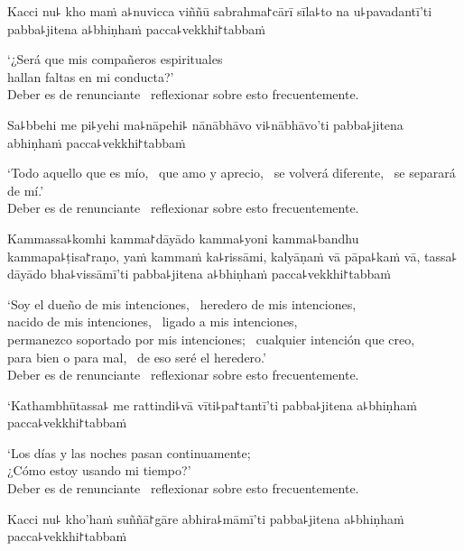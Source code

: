 Kacci nu꜕ kho maṁ a꜕nuvicca viññū sabrahma꜓cārī sīla꜕to na u꜕pavadantī'ti pabba꜕jitena a꜕bhiṇhaṁ pacca꜕vekkhi꜓tabbaṁ

\begin{english}
  ‘¿Será que mis compañeros espirituales \pause\\
  hallan faltas en mi conducta?’ \pause\\
  Deber es de renunciante \pause\ reflexionar sobre esto frecuentemente.
\end{english}

Sa꜕bbehi me pi꜕yehi ma꜕nāpehi꜕ nānābhāvo vi꜕nābhāvo'ti pabba꜕jitena abhiṇhaṁ pacca꜕vekkhi꜓tabbaṁ

\begin{english}
  ‘Todo aquello que es mío, \pause\ que amo y aprecio, \pause\ se volverá diferente, \pause\ se separará de mí.’ \pause\\
  Deber es de renunciante \pause\ reflexionar sobre esto frecuentemente.
\end{english}

Kammassa꜕komhi kamma꜓dāyādo kamma꜕yoni kamma꜕bandhu kammapa꜕ṭisa꜓raṇo, yaṁ kammaṁ ka꜕rissāmi, kalyāṇaṁ vā pāpa꜕kaṁ vā, tassa꜕ dāyādo bha꜕vissāmī'ti pabba꜕jitena a꜕bhiṇhaṁ pacca꜕vekkhi꜓tabbaṁ

\begin{english}
  ‘Soy el dueño de mis intenciones, \pause\ heredero de mis intenciones, \pause\\
  nacido de mis intenciones, \pause\ ligado a mis intenciones, \pause\\
  permanezco soportado por mis intenciones; \pause\ cualquier intención que creo, \pause\\
  para bien o para mal, \pause\ de eso seré el heredero.’ \pause\\
  Deber es de renunciante \pause\ reflexionar sobre esto frecuentemente.
\end{english}

\clearpage

`Kathambhūtassa꜕ me rattindi꜕vā vīti꜕pa꜓tantī'ti pabba꜕jitena a꜕bhiṇhaṁ pacca꜕vekkhi꜓tabbaṁ

\begin{english}
  ‘Los días y las noches pasan continuamente; \pause\\
  ¿Cómo estoy usando mi tiempo?’ \pause\\
  Deber es de renunciante \pause\ reflexionar sobre esto frecuentemente.
\end{english}

Kacci nu꜕ kho'haṁ suññā꜓gāre abhira꜕māmī'ti pabba꜕jitena a꜕bhiṇhaṁ pacca꜕vekkhi꜓tabbaṁ

